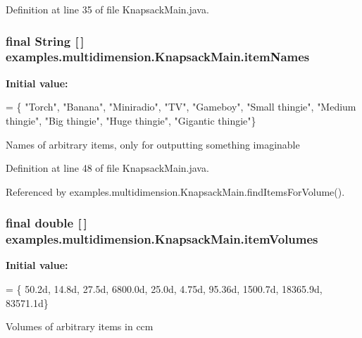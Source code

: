 Definition at line 35 of file Knapsack\-Main.\-java.

\hypertarget{classexamples_1_1multidimension_1_1_knapsack_main_ac612fc688cb3e65053186c30ea14be8c}{
\subsubsection[{item\-Names}]{\setlength{\rightskip}{0pt plus 5cm}final String \mbox{[}$\,$\mbox{]} examples.\-multidimension.\-Knapsack\-Main.\-item\-Names\hspace{0.3cm}{\ttfamily [static]}}}\label{classexamples_1_1multidimension_1_1_knapsack_main_ac612fc688cb3e65053186c30ea14be8c}
{\bfseries Initial value\-:}
\begin{DoxyCode}
= \{
      \textcolor{stringliteral}{"Torch"}, \textcolor{stringliteral}{"Banana"}, \textcolor{stringliteral}{"Miniradio"}, \textcolor{stringliteral}{"TV"}, \textcolor{stringliteral}{"Gameboy"}, \textcolor{stringliteral}{"Small thingie"},
      \textcolor{stringliteral}{"Medium thingie"}, \textcolor{stringliteral}{"Big thingie"}, \textcolor{stringliteral}{"Huge thingie"}, \textcolor{stringliteral}{"Gigantic thingie"}\}
\end{DoxyCode}
Names of arbitrary items, only for outputting something imaginable 

Definition at line 48 of file Knapsack\-Main.\-java.



Referenced by examples.\-multidimension.\-Knapsack\-Main.\-find\-Items\-For\-Volume().

\hypertarget{classexamples_1_1multidimension_1_1_knapsack_main_a06ff6c3f26e1f3920d184f6c6a97d1e9}{
\subsubsection[{item\-Volumes}]{\setlength{\rightskip}{0pt plus 5cm}final double \mbox{[}$\,$\mbox{]} examples.\-multidimension.\-Knapsack\-Main.\-item\-Volumes\hspace{0.3cm}{\ttfamily [static]}}}\label{classexamples_1_1multidimension_1_1_knapsack_main_a06ff6c3f26e1f3920d184f6c6a97d1e9}
{\bfseries Initial value\-:}
\begin{DoxyCode}
= \{
      50.2d, 14.8d, 27.5d, 6800.0d, 25.0d, 4.75d, 95.36d, 1500.7d, 18365.9d,
      83571.1d\}
\end{DoxyCode}
Volumes of arbitrary items in ccm 

